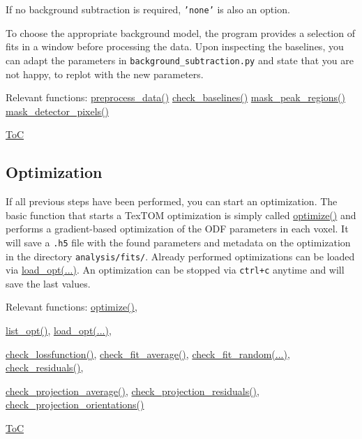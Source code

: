 If no background subtraction is required, \texttt{'none'} is also an option.

To choose the appropriate background model, the program provides a selection of fits in a window before processing the data.
Upon inspecting the baselines, you can adapt the parameters in \texttt{background\_subtraction.py} and state that you are not happy,
to replot with the new parameters.

Relevant functions:
\hyperref[fun:preprocessdata]{preprocess\_data()}
\hyperref[fun:checkbaselines]{check\_baselines()}
\hyperref[fun:maskpeakregions]{mask\_peak\_regions()}
\hyperref[fun:maskdetectorpixels]{mask\_detector\_pixels()}

\begin{flushright}
    \hyperref[toc]{ToC}
\end{flushright}

\subsection{Optimization}
If all previous steps have been performed, you can start an optimization.
The basic function that starts a TexTOM optimization is simply called \hyperref[fun:optimize]{optimize()} and
performs a gradient-based optimization of the ODF parameters in each voxel.
It will save a \texttt{.h5} file with the found parameters and metadata on the optimization in the directory
\texttt{analysis/fits/}. Already performed optimizations can be loaded via \hyperref[fun:loadopt]{load\_opt(...)}.
An optimization can be stopped via \texttt{ctrl+c} anytime and will save the last values.

Relevant functions:
\hyperref[fun:optimize]{optimize()},

\hyperref[fun:listopt]{list\_opt()},
\hyperref[fun:loadopt]{load\_opt(...)},

\hyperref[fun:checklossfunction]{check\_lossfunction()},
\hyperref[fun:checkfitaverage]{check\_fit\_average()},
\hyperref[fun:checkfitrandom]{check\_fit\_random(...)},
\hyperref[fun:checkresiduals]{check\_residuals()},

\hyperref[fun:checkprojectionsaverage]{check\_projection\_average()},
\hyperref[fun:checkprojectionsresiduals]{check\_projection\_residuals()},
\hyperref[fun:checkprojectionsorientations]{check\_projection\_orientations()}

\begin{flushright}
    \hyperref[toc]{ToC}
\end{flushright}

